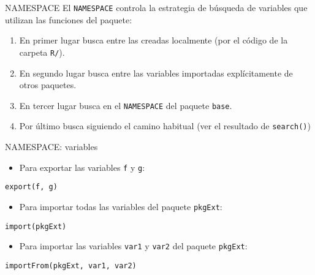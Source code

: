 \documentclass[xcolor={usenames,svgnames,dvipsnames}]{beamer}
\begin{document}
\begin{frame}[label={sec:orgf490690},fragile]{NAMESPACE}
 El \texttt{NAMESPACE} controla la estrategia de búsqueda de variables
  que utilizan las funciones del paquete:
\begin{enumerate}
\item En primer lugar busca entre las creadas localmente (por el código de la carpeta \texttt{R/}).
\item En segundo lugar busca entre las variables importadas
explícitamente de otros paquetes.
\item En tercer lugar busca en el \texttt{NAMESPACE} del paquete \texttt{base}.
\item Por último busca siguiendo el camino habitual (ver el
resultado de \texttt{search()})
\end{enumerate}
\end{frame}

\begin{frame}[label={sec:org2995ff7},fragile]{NAMESPACE: variables}
 \begin{itemize}
\item Para exportar las variables \texttt{f} y \texttt{g}:
\end{itemize}
\lstset{language=r,label= ,caption= ,captionpos=b,numbers=none}
\begin{lstlisting}
export(f, g)
\end{lstlisting}
\begin{itemize}
\item Para importar \alert{todas} las variables del paquete \texttt{pkgExt}:
\end{itemize}
\lstset{language=r,label= ,caption= ,captionpos=b,numbers=none}
\begin{lstlisting}
import(pkgExt)
\end{lstlisting}
\begin{itemize}
\item Para importar las variables \texttt{var1} y \texttt{var2} del paquete
\texttt{pkgExt}:
\end{itemize}
\lstset{language=r,label= ,caption= ,captionpos=b,numbers=none}
\begin{lstlisting}
importFrom(pkgExt, var1, var2)
\end{lstlisting}
\end{frame}
\end{document}
